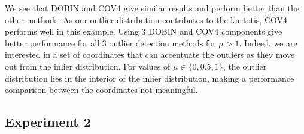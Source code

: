 \documentclass[letter,12pt]{article}
\begin{document}
{\color{blue} We see that DOBIN and COV4 give similar results and perform better than the other methods. As our outlier distribution contributes to the kurtotis, COV4 performs well in this example. }
Using $3$ DOBIN {\color{blue} and COV4 } components give {\color{blue} better }  performance for all $3$ outlier detection methods for $\mu > 1$. Indeed, we are interested in a set of coordinates that can accentuate the outliers as they move out from the inlier distribution. For values of $\mu \in \{0, 0.5, 1\}$, the outlier distribution lies in the interior of the inlier distribution, making a performance comparison between the coordinates not meaningful.

\subsection{Experiment 2}
\end{document}
